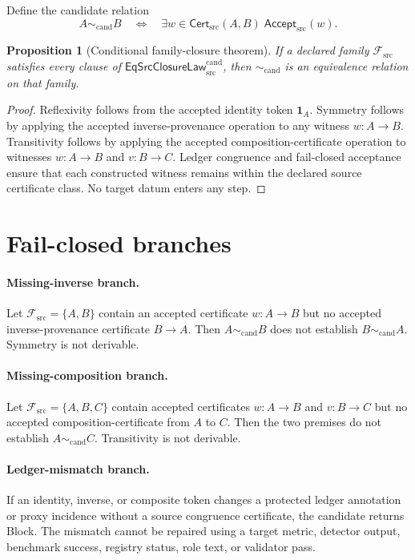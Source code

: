 \documentclass[11pt]{article}
\newtheorem{proposition}{Proposition}
\begin{document}
Define the candidate relation
\[
 A\sim_{\mathrm{cand}}B
 \quad\Longleftrightarrow\quad
 \exists w\in\mathsf{Cert}_{\mathrm{src}}(A,B)
 \;\mathsf{Accept}_{\mathrm{src}}(w).
\]

\begin{proposition}[Conditional family-closure theorem]
If a declared family $\mathcal F_{\mathrm{src}}$ satisfies every clause of
$\mathsf{EqSrcClosureLaw}^{\mathrm{cand}}_{\mathrm{src}}$, then
$\sim_{\mathrm{cand}}$ is an equivalence relation on that family.
\end{proposition}

\begin{proof}
Reflexivity follows from the accepted identity token $\mathbf 1_A$. Symmetry
follows by applying the accepted inverse-provenance operation to any witness
$w:A\to B$. Transitivity follows by applying the accepted
composition-certificate operation to witnesses $w:A\to B$ and $v:B\to C$.
Ledger congruence and fail-closed acceptance ensure that each constructed
witness remains within the declared source certificate class. No target datum
enters any step.
\end{proof}

\section{Fail-closed branches}

\paragraph{Missing-inverse branch.}
Let $\mathcal F_{\mathrm{src}}=\{A,B\}$ contain an accepted certificate
$w:A\to B$ but no accepted inverse-provenance certificate $B\to A$. Then
$A\sim_{\mathrm{cand}}B$ does not establish
$B\sim_{\mathrm{cand}}A$. Symmetry is not derivable.

\paragraph{Missing-composition branch.}
Let $\mathcal F_{\mathrm{src}}=\{A,B,C\}$ contain accepted certificates
$w:A\to B$ and $v:B\to C$ but no accepted composition-certificate from $A$ to
$C$. Then the two premises do not establish $A\sim_{\mathrm{cand}}C$.
Transitivity is not derivable.

\paragraph{Ledger-mismatch branch.}
If an identity, inverse, or composite token changes a protected ledger
annotation or proxy incidence without a source congruence certificate, the
candidate returns \textsf{Block}. The mismatch cannot be repaired using a
target metric, detector output, benchmark success, registry status, role text,
or validator pass.
\end{document}
